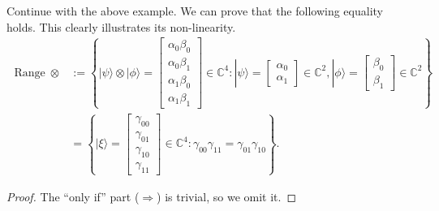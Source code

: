 \begin{example}
    Continue with the above example. We can prove that the following equality holds. This clearly illustrates its non-linearity.
        \begin{align}
        \operatorname{Range} \otimes & :=\left\{|\psi\rangle \otimes|\phi\rangle=\left[\begin{array}{l}
        \alpha_0\beta_0 \\
        \alpha_0\beta_1 \\
        \alpha_1\beta_0 \\
        \alpha_1\beta_1
        \end{array}\right] \in \mathbb{C}^4:
        |\psi\rangle=\left[\begin{array}{l}
        \alpha_0 \\
        \alpha_1
        \end{array}\right] \in \mathbb{C}^2,
        |\phi\rangle=\left[\begin{array}{l}
        \beta_0 \\
        \beta_1
        \end{array}\right] \in \mathbb{C}^2
        \right\} \\
        & =\left\{|\xi\rangle=\left[\begin{array}{l}\gamma_{00} \\ \gamma_{01} \\ \gamma_{10} \\ \gamma_{11} \end{array}\right] \in \mathbb{\mathbb { C }}^{4}: \gamma_{00} \gamma_{11}=\gamma_{01} \gamma_{10}\right\}. \label{set2}
        \end{align}
    \begin{proof}
        The ``only if'' part ($\Longrightarrow$) is trivial, so we omit it. 


\end{proof}
\end{example}
